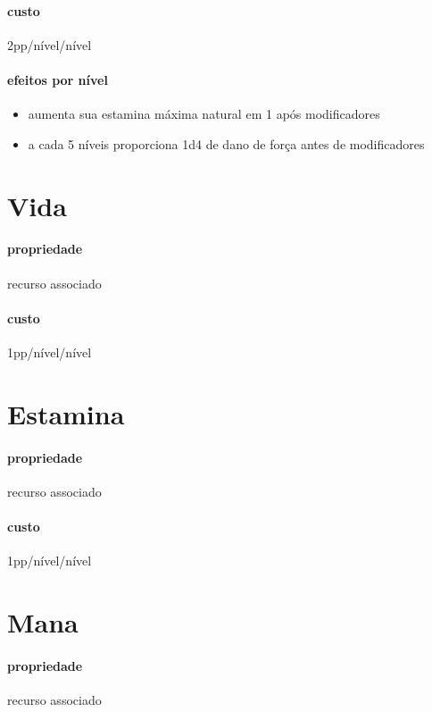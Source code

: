 \paragraph{custo} 2pp/nível/nível
\paragraph{efeitos por nível} 
\begin{itemize}
  \item aumenta sua estamina máxima natural em 1 após modificadores
  \item a cada 5 níveis proporciona 1d4 de dano de força antes de modificadores
\end{itemize}
%
%
\section{Vida}
\paragraph{propriedade} recurso associado
\paragraph{custo} 1pp/nível/nível
%
%
\section{Estamina}
\paragraph{propriedade} recurso associado
\paragraph{custo} 1pp/nível/nível
%
%
\section{Mana}
\paragraph{propriedade} recurso associado
